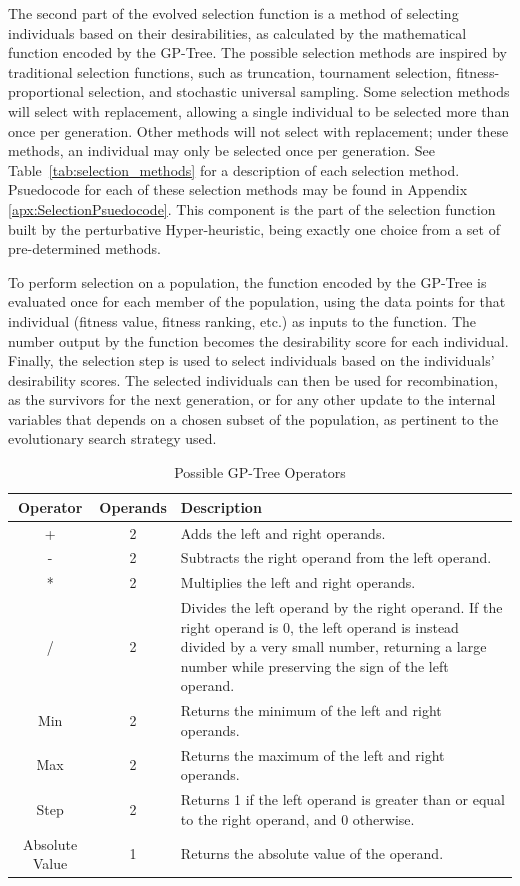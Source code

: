 \documentclass[sigconf]{acmart}
\begin{document}
The second part of the evolved selection function is a method of selecting individuals based on their desirabilities, as calculated by the mathematical function encoded by the GP-Tree. The possible selection methods are inspired by traditional selection functions, such as truncation, tournament selection, fitness-proportional selection, and stochastic universal sampling. Some selection methods will select with replacement, allowing a single individual to be selected more than once per generation. Other methods will not select with replacement; under these methods, an individual may only be selected once per generation. See Table~\ref{tab:selection_methods} for a description of each selection method. Psuedocode for each of these selection methods may be found in Appendix \ref{apx:SelectionPsuedocode}. This component is the part of the selection function built by the perturbative Hyper-heuristic, being exactly one choice from a set of pre-determined methods.

To perform selection on a population, the function encoded by the GP-Tree is evaluated once for each member of the population, using the data points for that individual (fitness value, fitness ranking, etc.) as inputs to the function. The number output by the function becomes the desirability score for each individual. Finally, the selection step is used to select individuals based on the individuals' desirability scores. The selected individuals can then be used for recombination, as the survivors for the next generation, or for any other update to the internal variables that depends on a chosen subset of the population, as pertinent to the evolutionary search strategy used.

\begin{table}
	\centering
	\caption{Possible GP-Tree Operators}
	\label{tab:gp-operators}
	\begin{tabular}{cc|p{4.5cm}}
		\toprule
		Operator & Operands & Description\\
		\midrule
		+ & 2 & Adds the left and right operands. \\
		\hline
		- & 2 & Subtracts the right operand from the left operand.\\    
		\hline
		* & 2 & Multiplies the left and right operands.\\  
		\hline
		/ & 2 & Divides the left operand by the right operand. If the right operand is 0, the left operand is instead divided by a very small number, returning a large number while preserving the sign of the left operand.\\      
		\hline
		Min & 2 & Returns the minimum of the left and right operands.\\
		\hline
		Max & 2 & Returns the maximum of the left and right operands.\\
		\hline
		Step & 2 & Returns 1 if the left operand is greater than or equal to the right operand, and 0 otherwise.\\
		\hline
		Absolute Value & 1 & Returns the absolute value of the operand.\\    
		
		\bottomrule
	\end{tabular}
\end{table}
\end{document}
